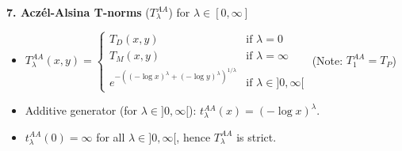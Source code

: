 \begin{example}
\textbf{7. Aczél-Alsina T-norms} ($T_\lambda^{AA}$) for $\lambda \in [0, \infty]$
\begin{itemize}
    \item $T_\lambda^{AA}(x,y) = \begin{cases} T_D(x,y) & \text{if } \lambda = 0 \\ T_M(x,y) & \text{if } \lambda = \infty \\ e^{-\left((-\log x)^\lambda + (-\log y)^\lambda\right)^{1/\lambda}} & \text{if } \lambda \in ]0, \infty[ \end{cases}$
    (Note: $T_1^{AA} = T_P$)
    \item Additive generator (for $\lambda \in ]0, \infty[$): $t_\lambda^{AA}(x) = (-\log x)^\lambda$.
    \item $t_\lambda^{AA}(0) = \infty$ for all $\lambda \in ]0, \infty[$, hence $T_\lambda^{AA}$ is strict.
\end{itemize}
\end{example}

